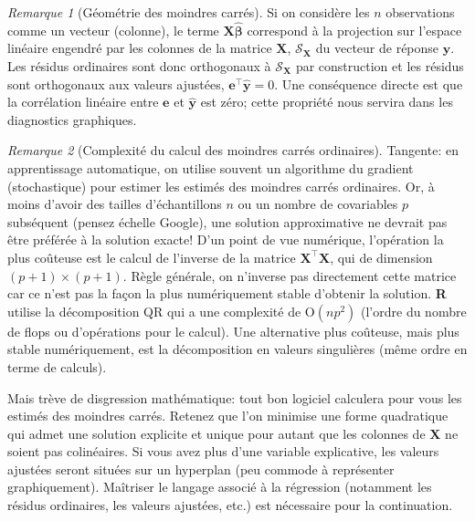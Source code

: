 \documentclass[
  11pt,
  letterpaper,
]{article}
\theoremstyle{definition}
\theoremstyle{definition}
\theoremstyle{definition}
\theoremstyle{remark}
\newtheorem*{remark}{Remarque}
\begin{document}
\begin{remark}[Géométrie des moindres carrés]
{}Si on considère les \(n\) observations comme un vecteur (colonne), le terme \(\mathbf{X} \widehat{\boldsymbol{\beta}}\) correspond à la projection sur l'espace linéaire engendré par les colonnes de la matrice \(\mathbf{X}\), \(\mathscr{S}_{\mathbf{X}}\) du vecteur de réponse \(\boldsymbol{y}\). Les résidus ordinaires sont donc orthogonaux à \(\mathscr{S}_{\mathbf{X}}\) par construction et les résidus sont orthogonaux aux valeurs ajustées, \(\boldsymbol{e}^\top\widehat{\boldsymbol{y}}=0\).
Une conséquence directe est que la corrélation linéaire entre \(\boldsymbol{e}\) et \(\widehat{\boldsymbol{y}}\) est zéro; cette propriété nous servira dans les diagnostics graphiques.
\end{remark}

\begin{remark}[Complexité du calcul des moindres carrés ordinaires]
{}Tangente: en apprentissage automatique, on utilise souvent un algorithme du gradient (stochastique) pour estimer les estimés des moindres carrés ordinaires. Or, à moins d'avoir des tailles d'échantillons \(n\) ou un nombre de covariables \(p\) subséquent (pensez échelle Google), une solution approximative ne devrait pas être préférée à la solution exacte! D'un point de vue numérique, l'opération la plus coûteuse est le calcul de l'inverse de la matrice \(\mathbf{X}^\top\mathbf{X}\), qui de dimension \((p+1) \times (p+1)\). Règle générale, on n'inverse pas directement cette matrice car ce n'est pas la façon la plus numériquement stable d'obtenir la solution. \textbf{R} utilise la décomposition QR qui a une complexité de \(\mathrm{O}(np^2)\) (l'ordre du nombre de flops ou d'opérations pour le calcul). Une alternative plus coûteuse, mais plus stable numériquement, est la décomposition en valeurs singulières (même ordre en terme de calculs).
\end{remark}

Mais trève de disgression mathématique: tout bon logiciel calculera pour vous les estimés des moindres carrés. Retenez que l'on minimise une forme quadratique qui admet une solution explicite et unique pour autant que les colonnes de \(\mathbf{X}\) ne soient pas colinéaires. Si vous avez plus d'une variable explicative, les valeurs ajustées seront situées sur un hyperplan (peu commode à représenter graphiquement). Maîtriser le langage associé à la régression (notamment les résidus ordinaires, les valeurs ajustées, etc.) est nécessaire pour la continuation.
\end{document}
